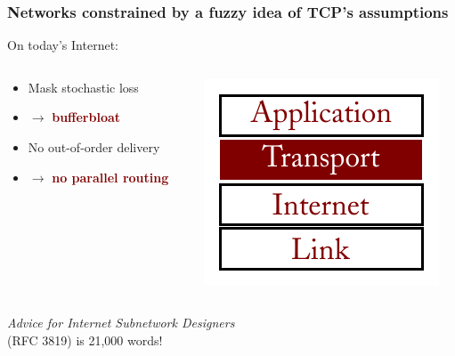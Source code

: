 \documentclass[svgnames]{beamer}
\begin{document}
\begin{frame}
\frametitle{Networks constrained by a fuzzy idea of TCP's assumptions}

\Large

On today's Internet:

\begin{columns}

\begin{column}{0.66\textwidth}

\begin{itemize}
\item Mask stochastic loss
\item[] \hspace{1 cm}$\rightarrow$ {\bf \textcolor{Maroon}{bufferbloat}}

\item No out-of-order delivery
\item[] \hspace{1 cm}$\rightarrow$ {\bf \textcolor{Maroon}{no parallel routing}}
\end{itemize}

\end{column}

\begin{column}{0.33\textwidth}

\includegraphics[width=\textwidth]{transport.pdf}

\end{column}

\end{columns}

\vspace{\baselineskip}

{\it Advice for Internet Subnetwork Designers}\\ (RFC 3819) is 21,000 words!

\end{frame}
\end{document}

